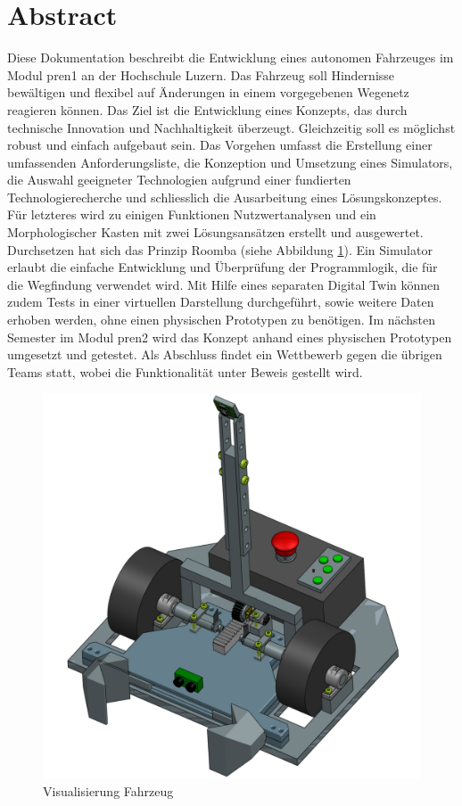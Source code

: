 \newpage
\section{Abstract}

Diese Dokumentation beschreibt die Entwicklung eines autonomen Fahrzeuges im Modul \acrfull{pren1} an der Hochschule Luzern. Das Fahrzeug soll Hindernisse bewältigen und flexibel auf Änderungen in einem vorgegebenen Wegenetz reagieren können. Das Ziel ist die Entwicklung eines Konzepts, das durch technische Innovation und Nachhaltigkeit überzeugt. Gleichzeitig soll es möglichst robust und einfach aufgebaut sein.
Das Vorgehen umfasst die Erstellung einer umfassenden Anforderungsliste, die Konzeption und Umsetzung eines Simulators, die Auswahl geeigneter Technologien aufgrund einer fundierten Technologierecherche und schliesslich die Ausarbeitung eines Lösungskonzeptes. Für letzteres wird zu einigen Funktionen Nutzwertanalysen und ein Morphologischer Kasten mit zwei Lösungsansätzen erstellt und ausgewertet. Durchsetzen hat sich das Prinzip Roomba (siehe Abbildung \ref{img:Visualisierung Fahrzeug}). Ein Simulator erlaubt die einfache Entwicklung und Überprüfung der Programmlogik, die für die Wegfindung verwendet wird. Mit Hilfe eines separaten Digital Twin können zudem Tests in einer virtuellen Darstellung durchgeführt, sowie weitere Daten erhoben werden, ohne einen physischen Prototypen zu benötigen. 
Im nächsten Semester im Modul \acrshort{pren2} wird das Konzept anhand eines physischen Prototypen umgesetzt und getestet. Als Abschluss findet ein Wettbewerb gegen die übrigen Teams statt, wobei die Funktionalität unter Beweis gestellt wird.

\begin{figure}[H] %
    \centering
        \includegraphics[width=0.5\linewidth]       {Skizze_Fahrzeug.png}               \caption[Visualisierung Fahrzeug]
        {Visualisierung Fahrzeug}
        
        \label{img:Visualisierung Fahrzeug}
    \end{figure} 